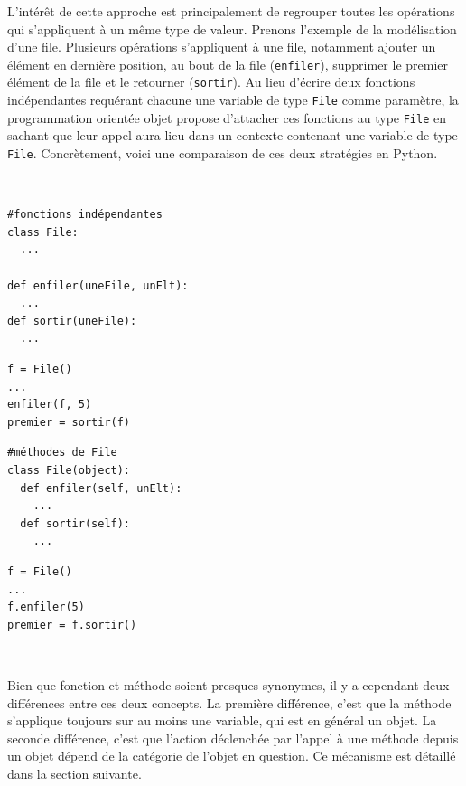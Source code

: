 \documentclass[a4paper,francais]{insalyon}
\begin{document}
L'intérêt de cette approche est principalement de regrouper toutes les opérations qui s'appliquent à un même type de valeur. Prenons l'exemple de la modélisation d'une file. Plusieurs opérations s'appliquent à une file, notamment ajouter un élément en dernière position, au bout de la file (\texttt{enfiler}), supprimer le premier élément de la file et le retourner (\texttt{sortir}). Au lieu d'écrire deux fonctions indépendantes requérant chacune une variable de type \texttt{File} comme paramètre, la programmation orientée objet propose d'attacher ces fonctions au type \texttt{File} en sachant que leur appel aura lieu dans un contexte contenant une variable de type \texttt{File}. Concrètement, voici une comparaison de ces deux stratégies en Python.

~

\begin{minipage}[c]{0.45\textwidth}
\begin{verbatim}
#fonctions indépendantes
class File:
  ...

def enfiler(uneFile, unElt):
  ...
def sortir(uneFile):
  ...
\end{verbatim}
\begin{verbatim}
f = File()
...
enfiler(f, 5)
premier = sortir(f)
\end{verbatim}
\end{minipage}
%
\hfill\vline\hfill
%
\begin{minipage}[c]{0.45\textwidth}
\begin{verbatim}
#méthodes de File
class File(object):
  def enfiler(self, unElt):
    ...
  def sortir(self):
    ...
\end{verbatim}

\vspace{0.4cm}

\begin{verbatim}
f = File()
...
f.enfiler(5)
premier = f.sortir()
\end{verbatim}
\end{minipage}

~

Bien que fonction et méthode soient presques synonymes, il y a cependant deux différences entre ces deux concepts. La première différence, c'est que la méthode s'applique toujours sur au moins une variable, qui est en général un objet. La seconde différence, c'est que l'action déclenchée par l'appel à une méthode depuis un objet dépend de la catégorie de l'objet en question. Ce mécanisme est détaillé dans la section suivante. 
\end{document}
